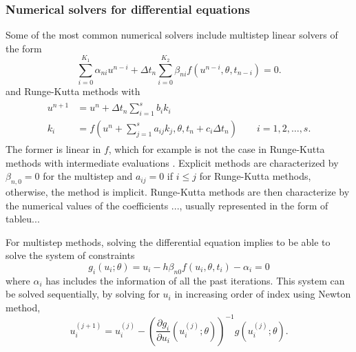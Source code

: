 

\subsubsection{Numerical solvers for differential equations}
\label{section:intro-numerical-solvers}

Some of the most common numerical solvers include multistep linear solvers of the form 
\begin{equation}
    \sum_{i=0}^{K_1} \alpha_{ni} u^{n-i} 
    +
    \Delta t_n \sum_{i=0}^{K_2} \beta_{ni} f(u^{n-i}, \theta, t_{n-i})
    = 
    0.
\end{equation}
and Runge-Kutta methods with 
\begin{align}
\begin{split}
    u^{n+1} 
    &= 
    u^n 
    + 
    \Delta t_n \sum_{i=1}^s b_i k_i \\
    k_i 
    &= 
    f \left(u^n + \sum_{j=1}^s a_{ij} k_j , \theta ,  t_n + c_i \Delta t_n \right) \qquad i=1,2, \ldots, s.
    \label{eq:Runge-Kutta-scheme}
\end{split}
\end{align}
The former is linear in $f$, which for example is not the case in Runge-Kutta methods with intermediate evaluations \cite{ascher2008numerical}.
Explicit methods are characterized by $\beta_{n, 0} = 0$ for the multistep and $a_{ij}=0$ if $i \leq j$ for Runge-Kutta methods, otherwise, the method is implicit. 
Runge-Kutta methods are then characterize by the numerical values of the coefficients ..., usually represented in the form of tableu... 

For multistep methods, solving the differential equation implies to be able to solve the system of constraints
\begin{equation}
    g_i(u_i; \theta) = u_i - h \beta_{n0} f(u_i, \theta, t_i) - \alpha_i = 0
\end{equation}
where $\alpha_i$ has includes the information of all the past iterations. 
This system can be solved sequentially, by solving for $u_i$ in increasing order of index using Newton method,  
\begin{equation}
    u_i^{(j+1)} 
    = 
    u_i^{(j)} - \left( \frac{\partial g_i}{\partial u_i} (u_i^{(j)}; \theta) \right)^{-1} g(u_i^{(j)}; \theta).
    \label{eq:newton-method}
\end{equation}


